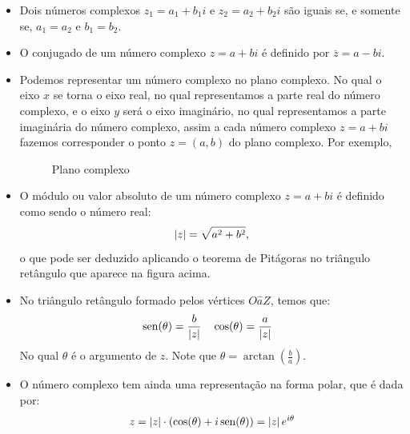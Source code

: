  \begin{defi}
 \begin{itemize}
 \item Dois números complexos $z_1= a_1 + b_1i$ e $z_2= a_2 + b_2i$ são iguais se, e somente se, $a_1=a_2$ e $b_1= b_2$.
 \item O conjugado de um número complexo $z= a+bi$ é definido por $\overline{z}= a - bi$.
 \item Podemos representar um número complexo no plano complexo. No qual o eixo $x$ se torna o eixo real, no qual representamos a parte real do número complexo, e o eixo $y$ será o eixo imaginário, no qual representamos a parte imaginária do número complexo, assim a cada número complexo $z= a+bi$ fazemos corresponder o ponto $z= (a, b)$ do plano complexo. Por exemplo,

 \begin{figure}[H]
   \centering
   \caption{Plano complexo}
  \end{figure}

 \item O módulo ou valor absoluto de um número complexo $z= a+bi$ é definido como sendo o número real:
 \[\left|z\right|= \sqrt{a^2 + b^2},\]
 o que pode ser deduzido aplicando o teorema de Pitágoras no triângulo retângulo que aparece na figura acima.
 \item No triângulo retângulo formado pelos vértices $O\hat{a}Z$, temos que:
  \begin{align*}
 & \operatorname{sen}(\theta)= \frac{b}{\left|z\right|} & & \cos(\theta)= \frac{a}{\left|z\right|} &
 \end{align*}
 No qual $\theta$ é o argumento de $z$. Note que $\theta= \arctan \left( \frac{b}{a} \right)$.

 \item O número complexo tem ainda uma representação na forma polar, que é dada por:
 \[z= \left|z\right|\cdot (\cos(\theta) + i \operatorname{sen}(\theta))= \left|z\right| e^{i \theta} \]

 \end{itemize}
 \end{defi}

